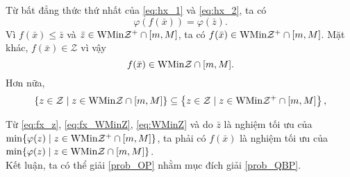 \begin{cm}
    Từ bất đẳng thức thứ nhất của \eqref{eq:hx_1} và \eqref{eq:hx_2}, ta có
    \begin{equation}
    \varphi(f(\bar{x}))=\varphi(\bar{z}).\label{eq:fx_z}
    \end{equation}
    Vì $f(\bar{x})\le\bar{z}$ và $\bar{z}\in{\rm WMin}\mathcal{Z}^{+}\cap[m,M]$, ta có $f(\bar{x})\in{\rm WMin}\mathcal{Z}^{+}\cap[m,M]$. Mặt khác, $f(\bar{x})\in\mathcal{Z}$ vì vậy
    \begin{equation}
    f(\bar{x})\in{\rm WMin}\mathcal{Z}\cap[m,M].\label{eq:fx_WMinZ}
    \end{equation}
    Hơn nữa,
    \begin{equation}
    \left\{ z\in\mathcal{Z}\mid z\in{\rm WMin}\mathcal{Z}\cap[m,M]\right\} \subseteq\left\{ z\in\mathcal{Z}\mid z\in{\rm WMin}\mathcal{Z}^{+}\cap[m,M]\right\} ,\label{eq:WMinZ}
    \end{equation}
    
    Từ \eqref{eq:fx_z}, \eqref{eq:fx_WMinZ}, \eqref{eq:WMinZ} và
    do $\bar{z}$ là nghiệm tối ưu của $\min\{\varphi(z)\mid z\in{\rm WMin}\mathcal{Z}^{+}\cap[m,M]\}$, ta phải có $f(\bar{x})$ là nghiệm tối ưu của $\min\{\varphi(z)\mid z\in{\rm WMin}\mathcal{Z}\cap[m,M]\}$.\\
    \indent Kết luận, ta có thể giải \ref{prob_OP} nhằm mục đích giải \ref{prob_QBP}.
\end{cm}